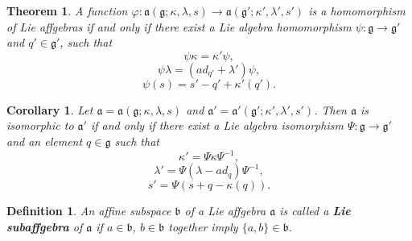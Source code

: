 \documentclass{article}
\newtheorem{definition}{Definition}[section]
\newtheorem{theorem}{Theorem}[section]
\newtheorem{corollary}{Corollary}[theorem]
\theoremstyle{definition}
\theoremstyle{remark}
\theoremstyle{plain}
\begin{document}
\begin{theorem}\cite{And2}
     A function $\varphi:\mathfrak{a}(\mathfrak{g}; \kappa,\lambda,s)\to \mathfrak{a}(\mathfrak{g'}; \kappa',\lambda',s')$ is a homomorphism of Lie affgebras if and only if there exist a Lie algebra homomorphism
$\psi: \mathfrak{g}\to\mathfrak{g'}$ and $q'\in \mathfrak{g'}$, such that
    \begin{equation}
        \psi \kappa = \kappa'\psi,
    \end{equation}
    \begin{equation}
        \psi \lambda = (ad_{q'} +\lambda')\psi,
    \end{equation}
    \begin{equation}
        \psi (s) = s' - q' +\kappa'(q').
    \end{equation}
\end{theorem}
 \begin{corollary}\cite{And2}
     Let $\mathfrak{a} =\mathfrak{a}(\mathfrak{g}; \kappa,\lambda,s)$ and $\mathfrak{a'} = \mathfrak{a'}(\mathfrak{g'}; \kappa',\lambda',s')$. Then $\mathfrak{a}$ is isomorphic to $\mathfrak{a'}$ if and only if there exist a Lie algebra isomorphism $\Psi: \mathfrak{g}\to \mathfrak{g'}$ and an element $q\in \mathfrak{g}$ such that
        \begin{equation}
            \kappa' = \Psi \kappa \Psi^{-1},
        \end{equation}
        \begin{equation}
            \lambda' = \Psi (\lambda - ad_{q}) \Psi^{-1},
        \end{equation}
        \begin{equation}
            s' = \Psi(s+ q -\kappa(q)).
        \end{equation}
 \end{corollary}
 \begin{definition}
     An affine subspace $\mathfrak{b}$ of a Lie affgebra $\mathfrak{a}$ is called a \textbf{Lie subaffgebra} of $\mathfrak{a}$ if $a\in \mathfrak{b}$, $b\in \mathfrak{b}$ together imply $\{a, b\}\in \mathfrak{b}$.
 \end{definition}
\end{document}

